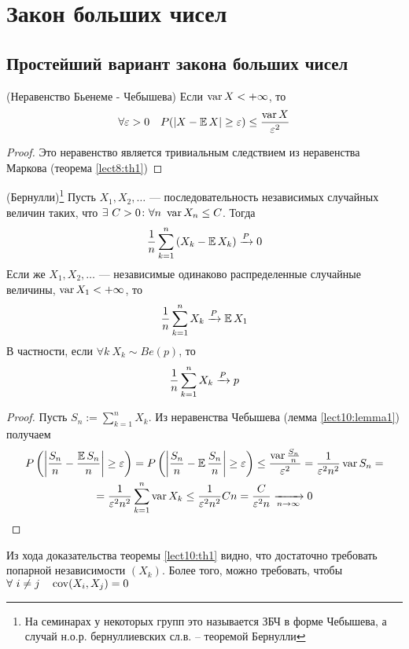 \section{Закон больших чисел}
	\subsection{Простейший вариант закона больших чисел}
		\begin{lemma}\label{lect10:lemma1}
			(Неравенство Бьенеме - Чебышева)
			Если $\var X < +\infty$, то \begin{equation*}
				\forall \varepsilon > 0 \quad \P(\left|X-\E X\right|\geq \varepsilon) \leq \frac{\var X}{\varepsilon^2}
			\end{equation*}
		\end{lemma}
		\begin{proof}
			Это неравенство является тривиальным следствием из неравенства Маркова (теорема \ref{lect8:th1})
		\end{proof}
		\begin{theorem}\label{lect10:th1}
			(Бернулли)\footnote{На семинарах у некоторых групп это называется ЗБЧ в форме Чебышева, а случай н.о.р. бернуллиевских сл.в. -- теоремой Бернулли}
			Пусть $X_1, X_2, \dots$ --- последовательность независимых случайных величин таких, что $\exists \ C>0\colon \forall n \ \var X_n \leq C$.
			Тогда 
			\begin{equation*}
				\frac{1}{n}\sum_{k=1}^{n} \left(X_k - \E X_k\right) \xrightarrow{\P} 0
			\end{equation*}
			Если же $X_1, X_2, \dots$ --- независимые одинаково распределенные случайные величины, $\var X_1 < +\infty$, то
			\begin{equation*}
				\frac{1}{n}\sum_{k=1}^{n} X_k \xrightarrow{\P} \E X_1
			\end{equation*}
			В частности, если $\forall k \ X_k \sim Be(p)$, то 
			\begin{equation*}
				\frac{1}{n}\sum_{k=1}^{n} X_k \xrightarrow{\P} p
			\end{equation*}
		\end{theorem}
		\begin{proof}
			Пусть $S_n:=\sum_{k=1}^{n} X_k$.	Из неравенства Чебышева (лемма \ref{lect10:lemma1})  получаем
			\begin{multline*}
				\P\left(\left|\frac{S_n}{n} -\frac{\E S_n}{n}\right|\geq \varepsilon\right) = \P\left(\left|\frac{S_n}{n} -\E\frac{ S_n}{n}\right|\geq \varepsilon\right)\leq\frac{\var \frac{S_n}{n}}{\varepsilon^2} =\frac{1}{\varepsilon^2 n^2}\var S_n =\\= \frac{1}{\varepsilon^2 n^2} \sum_{k=1}^{n} \var X_k
				\leq\frac{1}{\varepsilon^2 n^2} C n = \frac{C}{\varepsilon^2 n} \xrightarrow[n\to \infty]{}0
			\end{multline*}
		\end{proof}
		\begin{nb}
			Из хода доказательства теоремы \ref{lect10:th1} видно, что достаточно требовать попарной независимости $\left(X_k\right)$. Более того, можно требовать, чтобы $\forall \ i\neq j \quad \cov(X_i, X_j) = 0$
		\end{nb}
